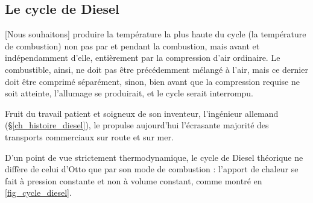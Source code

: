 	\subsection{Le cycle de Diesel}
	\label{ch_cycle_diesel}

			[Nous souhaitons] produire la température la plus haute du cycle (la température de combustion) non pas par et pendant la combustion, mais avant et indépendamment d’elle, entièrement par la compression d’air ordinaire. \jecourte
Le combustible, ainsi, ne doit pas être précédemment mélangé à l’air, mais ce dernier doit être comprimé séparément, sinon, bien avant que la compression requise ne soit atteinte, l’allumage se produirait, et le cycle serait interrompu.
		
		Fruit du travail patient et soigneux de son inventeur, l’ingénieur allemand  (\S\ref{ch_histoire_diesel}), le  propulse aujourd’hui l’écrasante majorité des transports commerciaux sur route et sur mer.

		D’un point de vue strictement thermodynamique, le cycle de Diesel théorique ne diffère de celui d’Otto que par son mode de combustion : l’apport de chaleur se fait à pression constante et non à volume constant, comme montré en \cref{fig_cycle_diesel}.

